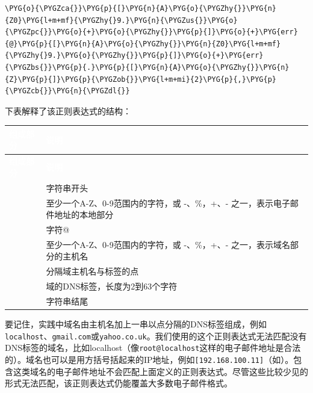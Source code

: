 \begin{codeblockbg}
\begin{Verbatim}[commandchars=\\\{\},breaklines=true,breakanywhere=true,fontsize=\codefont,xleftmargin=17bp]
\PYG{o}{\PYGZca{}}\PYG{p}{[}\PYG{n}{A}\PYG{o}{\PYGZhy{}}\PYG{n}{Z0}\PYG{l+m+mf}{\PYGZhy{}9.}\PYG{n}{\PYGZus{}}\PYG{o}{\PYGZpc{}}\PYG{o}{+}\PYG{o}{\PYGZhy{}}\PYG{p}{]}\PYG{o}{+}\PYG{err}{@}\PYG{p}{[}\PYG{n}{A}\PYG{o}{\PYGZhy{}}\PYG{n}{Z0}\PYG{l+m+mf}{\PYGZhy{}9.}\PYG{o}{\PYGZhy{}}\PYG{p}{]}\PYG{o}{+}\PYG{err}{\PYGZbs{}}\PYG{p}{.}\PYG{p}{[}\PYG{n}{A}\PYG{o}{\PYGZhy{}}\PYG{n}{Z}\PYG{p}{]}\PYG{p}{\PYGZob{}}\PYG{l+m+mi}{2}\PYG{p}{,}\PYG{p}{\PYGZcb{}}\PYG{n}{\PYGZdl{}}
\end{Verbatim}
\end{codeblockbg}



下表解释了该正则表达式的结构：



\myTableBegin
\begin{xltabular}{\textwidth}{|>{\hsize\raggedright\arraybackslash}X|>{\hsize\raggedright\arraybackslash}X|}
\hline
{} \textcolor{white}{\textbf{组成部分}} & \textcolor{white}{\textbf{说明}} \\
\hline
\endfirsthead
{} \textcolor{white}{\textbf{组成部分}} & \textcolor{white}{\textbf{说明}} \\
\hline
\endhead
\myttbr{\textasciicircum{}} & 字符串开头\\
\hline
{} & 至少一个A-Z、0-9范围内的字符，或 -、\%，+、- 之一，表示电子邮件地址的本地部分\\
\hline
{} & 字符@ \\
\hline
{} & 至少一个A-Z、0-9范围内的字符，或 -、\%，+、- 之一，表示域名部分的主机名\\
\hline
{} & 分隔域主机名与标签的点\\
\hline
{} & 域的DNS标签，长度为2到63个字符\\
\hline
\myttbr{\$} & 字符串结尾\\
\hline
\end{xltabular}
\myTableEnd



要记住，实践中域名由主机名加上一串以点分隔的DNS标签组成，例如\texttt{localhost}、\texttt{gmail.\allowbreak{}com}或\texttt{yahoo.\allowbreak{}co.\allowbreak{}uk}。我们使用的这个正则表达式无法匹配没有DNS标签的域名，比如localhost（像\texttt{root@localhost}这样的电子邮件地址是合法的）。域名也可以是用方括号括起来的IP地址，例如\texttt{[192.\allowbreak{}168.\allowbreak{}100.\allowbreak{}11]}（如）。包含这类域名的电子邮件地址不会匹配上面定义的正则表达式。尽管这些比较少见的形式无法匹配，该正则表达式仍能覆盖大多数电子邮件格式。



